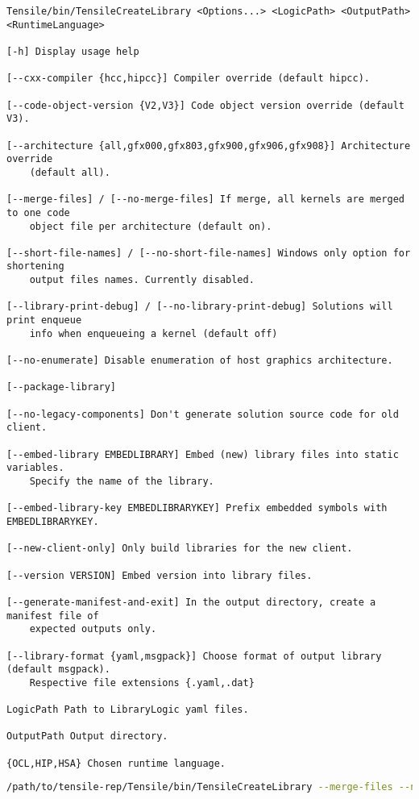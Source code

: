 \documentclass[]{article}
\begin{document}
\begin{verbatim}
Tensile/bin/TensileCreateLibrary <Options...> <LogicPath> <OutputPath> <RuntimeLanguage>

[-h] Display usage help

[--cxx-compiler {hcc,hipcc}] Compiler override (default hipcc).

[--code-object-version {V2,V3}] Code object version override (default V3).

[--architecture {all,gfx000,gfx803,gfx900,gfx906,gfx908}] Architecture override 
    (default all).

[--merge-files] / [--no-merge-files] If merge, all kernels are merged to one code 
    object file per architecture (default on).

[--short-file-names] / [--no-short-file-names] Windows only option for shortening 
    output files names. Currently disabled.

[--library-print-debug] / [--no-library-print-debug] Solutions will print enqueue 
    info when enqueueing a kernel (default off)

[--no-enumerate] Disable enumeration of host graphics architecture.

[--package-library]

[--no-legacy-components] Don't generate solution source code for old client.

[--embed-library EMBEDLIBRARY] Embed (new) library files into static variables. 
    Specify the name of the library.

[--embed-library-key EMBEDLIBRARYKEY] Prefix embedded symbols with EMBEDLIBRARYKEY.

[--new-client-only] Only build libraries for the new client.

[--version VERSION] Embed version into library files.

[--generate-manifest-and-exit] In the output directory, create a manifest file of 
    expected outputs only.

[--library-format {yaml,msgpack}] Choose format of output library (default msgpack). 
    Respective file extensions {.yaml,.dat}

LogicPath Path to LibraryLogic yaml files.

OutputPath Output directory.

{OCL,HIP,HSA} Chosen runtime language.
\end{verbatim}

\begin{lstlisting}[language=bash]
/path/to/tensile-rep/Tensile/bin/TensileCreateLibrary --merge-files --no-legacy-components --no-short-file-names --no-library-print-debug --code-object-version=V3 --cxx-compiler=hipcc --library-format=msgpack path/to/new/logic path/to/drop/new/tensile HIP
\end{lstlisting}
\end{document}
